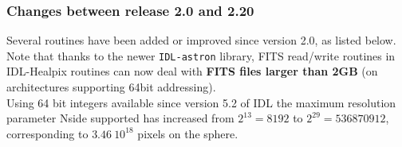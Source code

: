\documentclass[12pt,twoside]{article}
\begin{document}
{{\subsubsection{Changes between release 2.0 and 2.20}
Several routines have been added or improved since version 2.0, as listed below.
Note that thanks to the newer {\tt IDL-astron} library, FITS read/write routines
in IDL-Healpix routines can now deal with {\bf FITS files larger than 2GB} (on architectures supporting 64bit
addressing).\\
Using 64 bit integers available since version 5.2 of IDL the maximum resolution parameter Nside supported has increased
from $2^{13}=8192$ to $2^{29}=536870912$, corresponding to $3.46\ 10^{18}$
pixels on the sphere.

}}%

\end{document}
